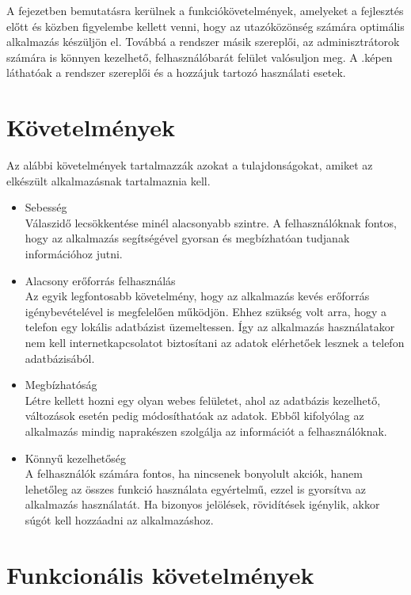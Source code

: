 
A fejezetben bemutatásra kerülnek a funkciókövetelmények, amelyeket a fejlesztés előtt és közben figyelembe kellett venni, hogy az utazóközönség számára optimális alkalmazás készüljön el. 
Továbbá a rendszer másik szereplői, az adminisztrátorok számára is könnyen kezelhető, felhasználóbarát felület valósuljon meg. 
A .képen láthatóak a rendszer szereplői és a hozzájuk tartozó használati esetek. 


\section{Követelmények}
\label{kovetelmeny}

Az alábbi követelmények tartalmazzák azokat a tulajdonságokat, amiket az elkészült alkalmazásnak tartalmaznia kell.

\begin{itemize}
	\item Sebesség
	\\
	Válaszidő lecsökkentése minél alacsonyabb szintre. 
	A felhasználóknak fontos, hogy az alkalmazás segítségével gyorsan és megbízhatóan tudjanak információhoz jutni. 
	\item Alacsony erőforrás felhasználás
	\\
	Az egyik legfontosabb követelmény, hogy az alkalmazás kevés erőforrás igénybevételével is megfelelően működjön. 
	Ehhez szükség volt arra, hogy a telefon egy lokális adatbázist üzemeltessen. 
	Így az alkalmazás használatakor nem kell internetkapcsolatot biztosítani az adatok elérhetőek lesznek a telefon adatbázisából.	
	\item Megbízhatóság
	\\
	Létre kellett hozni egy olyan webes felületet, ahol az adatbázis kezelhető, változások esetén pedig módosíthatóak az adatok. 
	Ebből kifolyólag az alkalmazás mindig naprakészen szolgálja az információt a felhasználóknak.
	\item Könnyű kezelhetőség
	\\
	A felhasználók számára fontos, ha nincsenek bonyolult akciók, hanem lehetőleg az összes funkció használata egyértelmű, ezzel is gyorsítva az alkalmazás használatát. 
	Ha bizonyos jelölések, rövidítések igénylik, akkor súgót kell hozzáadni az alkalmazáshoz.
	
\end{itemize}


\section{Funkcionális követelmények}
\label{funkckov}

